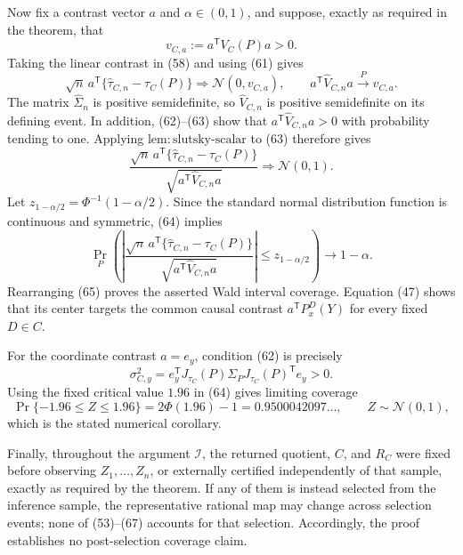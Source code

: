 Now fix a contrast vector \(a\) and \(\alpha\in(0,1)\), and suppose, exactly as required in the theorem, that
\[
 v_{C,a}:=a^{\mathsf T}V_C(P)a>0. \tag{62}
\]
Taking the linear contrast in (58) and using (61) gives
\[
 \sqrt n\,a^{\mathsf T}\{\widehat\tau_{C,n}-\tau_C(P)\}
 \Rightarrow\mathcal N(0,v_{C,a}),
 \qquad
 a^{\mathsf T}\widehat V_{C,n}a\xrightarrow{P}v_{C,a}. \tag{63}
\]
The matrix \(\widehat\Sigma_n\) is positive semidefinite, so \(\widehat V_{C,n}\) is positive semidefinite on its defining event.  In addition, (62)--(63) show that \(a^{\mathsf T}\widehat V_{C,n}a>0\) with probability tending to one.  Applying \(\mathrm{lem{:}slutsky\text{-}scalar}\) to (63) therefore gives
\[
 \frac{\sqrt n\,a^{\mathsf T}\{\widehat\tau_{C,n}-\tau_C(P)\}}
 {\sqrt{a^{\mathsf T}\widehat V_{C,n}a}}
 \Rightarrow\mathcal N(0,1). \tag{64}
\]
Let \(z_{1-\alpha/2}=\Phi^{-1}(1-\alpha/2)\).  Since the standard normal distribution function is continuous and symmetric, (64) implies
\[
 \Pr_P\!\left(
 \left|
 \frac{\sqrt n\,a^{\mathsf T}\{\widehat\tau_{C,n}-\tau_C(P)\}}
 {\sqrt{a^{\mathsf T}\widehat V_{C,n}a}}
 \right|
 \leq z_{1-\alpha/2}
 \right)
 \longrightarrow 1-\alpha. \tag{65}
\]
Rearranging (65) proves the asserted Wald interval coverage.  Equation (47) shows that its center targets the common causal contrast \(a^{\mathsf T}P_x^D(Y)\) for every fixed \(D\in C\).

For the coordinate contrast \(a=e_y\), condition (62) is precisely
\[
 \sigma_{C,y}^2
 =e_y^{\mathsf T}J_{\tau_C}(P)\Sigma_PJ_{\tau_C}(P)^{\mathsf T}e_y>0. \tag{66}
\]
Using the fixed critical value \(1.96\) in (64) gives limiting coverage
\[
 \Pr\{-1.96\leq Z\leq1.96\}
 =2\Phi(1.96)-1
 =0.9500042097\ldots,
 \qquad Z\sim\mathcal N(0,1), \tag{67}
\]
which is the stated numerical corollary.

Finally, throughout the argument \(\mathcal I\), the returned quotient, \(C\), and \(R_C\) were fixed before observing \(Z_1,\ldots,Z_n\), or externally certified independently of that sample, exactly as required by the theorem.  If any of them is instead selected from the inference sample, the representative rational map may change across selection events; none of (53)--(67) accounts for that selection.  Accordingly, the proof establishes no post-selection coverage claim.
